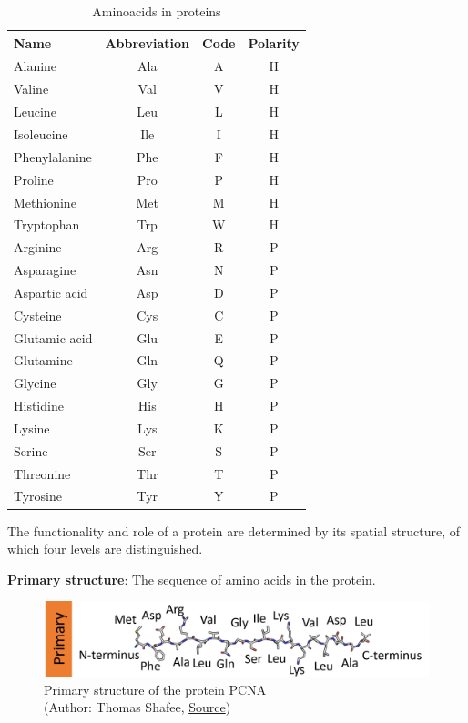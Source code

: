 \begin{table}[H]
\centering
\begin{tabular}{|l|ccc|}
\hline
Name          & Abbreviation & Code & Polarity \\
\hline
Alanine       & Ala & A & H \\
Valine        & Val & V & H \\
Leucine       & Leu & L & H \\
Isoleucine    & Ile & I & H \\
Phenylalanine & Phe & F & H \\
Proline       & Pro & P & H \\
Methionine    & Met & M & H \\
Tryptophan    & Trp & W & H \\
\hline
Arginine      & Arg & R & P \\
Asparagine    & Asn & N & P \\
Aspartic acid & Asp & D & P \\
Cysteine      & Cys & C & P \\
Glutamic acid & Glu & E & P \\
Glutamine     & Gln & Q & P \\
Glycine       & Gly & G & P \\
Histidine     & His & H & P \\
Lysine        & Lys & K & P \\
Serine        & Ser & S & P \\
Threonine     & Thr & T & P \\
Tyrosine      & Tyr & Y & P \\
\hline
\end{tabular}
\caption{Aminoacids in proteins}
\label{aminoacids20}
\end{table}

The functionality and role of a protein are determined by its spatial structure, of which four levels are distinguished.

\textbf{Primary structure}: The sequence of amino acids in the protein.

\begin{figure}[H]
    \centering
    \includegraphics[width=\textwidth]{figures/bioinformatics/protein_structure_primary.png}
    \caption{Primary structure of the protein PCNA\\(Author: Thomas Shafee, \href{https://en.wikipedia.org/wiki/File:Protein\_structure\_(full).png}{Source})}
\end{figure}


